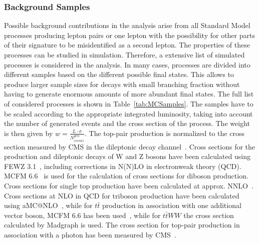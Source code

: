 \subsubsection{Background Samples}
Possible background contributions in the analysis arise from all Standard Model processes producing lepton pairs or one lepton with the possibility for other parts of their signature to be misidentified as a second lepton. The properties of these processes can be studied in simulation. Therefore, a extensive list of simulated processes is considered in the analysis. In many cases, processes are divided into different samples based on the different possible final states. This allows to produce larger sample sizes for decays with small branching fraction without having to generate enormous amounts of more abundant final states. The full list of considered processes is shown in Table~\ref{tab:MCSamples}. The samples have to be scaled according to the appropriate integrated luminosity, taking into account the number of generated events and the cross section of the process. The weight is then given by $w  = \frac{L\cdot \sigma}{N_{events}^{gen}}$. The top-pair production is normalized to the cross section measured by CMS in the dileptonic decay channel~\cite{CMS-PAS-TOP-12-007}. Cross sections for the production and dileptonic decays of W and Z bosons have been calculated using FEWZ 3.1~\cite{Li:2012wna}, including corrections in N(N)LO in electronweak theory (QCD). MCFM 6.6~\cite{Campbell:2011bn} is used for the calculation of cross sections for diboson production. Cross sections for single top production have been calculated at approx. NNLO~\cite{Kidonakis:2012db}. Cross sections at NLO in QCD for triboson production have been calculated using aMC@NLO~\cite{Madgraph2}, while for $t\bar{t}$ production in association with one additional vector boson, MCFM 6.6 has been used~\cite{Garzelli:2012bn}, while for  $t\bar{t}WW$ the cross section calculated by Madgraph is used. The cross section for top-pair production in association with a photon has been measured by CMS~\cite{CMS-PAS-TOP-13-011}.  
